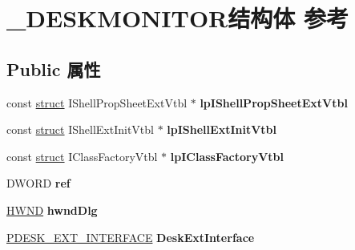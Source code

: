 \hypertarget{struct___d_e_s_k_m_o_n_i_t_o_r}{}\section{\+\_\+\+D\+E\+S\+K\+M\+O\+N\+I\+T\+O\+R结构体 参考}
\label{struct___d_e_s_k_m_o_n_i_t_o_r}
\subsection*{Public 属性}
\begin{DoxyCompactItemize}
\item 
\mbox{\label{struct___d_e_s_k_m_o_n_i_t_o_r_a28551a3be85d54c789c91563d37ef0de}} 
const \hyperlink{interfacestruct}{struct} I\+Shell\+Prop\+Sheet\+Ext\+Vtbl $\ast$ {\bfseries lp\+I\+Shell\+Prop\+Sheet\+Ext\+Vtbl}
\item 
\mbox{\label{struct___d_e_s_k_m_o_n_i_t_o_r_a8741bf2c64103741804e0382361f6235}} 
const \hyperlink{interfacestruct}{struct} I\+Shell\+Ext\+Init\+Vtbl $\ast$ {\bfseries lp\+I\+Shell\+Ext\+Init\+Vtbl}
\item 
\mbox{\label{struct___d_e_s_k_m_o_n_i_t_o_r_a6afc73c8e8c1b6695e4f182224420387}} 
const \hyperlink{interfacestruct}{struct} I\+Class\+Factory\+Vtbl $\ast$ {\bfseries lp\+I\+Class\+Factory\+Vtbl}
\item 
\mbox{\label{struct___d_e_s_k_m_o_n_i_t_o_r_a34d25d320b9c92a676b04f2262b54a4a}} 
D\+W\+O\+RD {\bfseries ref}
\item 
\mbox{\label{struct___d_e_s_k_m_o_n_i_t_o_r_acb312f82d85d8b802bc793cb0e0577c9}} 
\hyperlink{interfacevoid}{H\+W\+ND} {\bfseries hwnd\+Dlg}
\item 
\mbox{\label{struct___d_e_s_k_m_o_n_i_t_o_r_af061a04226a82b2f0dee48a91812b0bd}} 
\hyperlink{struct___d_e_s_k___e_x_t___i_n_t_e_r_f_a_c_e}{P\+D\+E\+S\+K\+\_\+\+E\+X\+T\+\_\+\+I\+N\+T\+E\+R\+F\+A\+CE} {\bfseries Desk\+Ext\+Interface}
\item 
\mbox{\label{struct___d_e_s_k_m_o_n_i_t_o_r_abe85ac312834bdc82da07d8ad67ec489}} 

\end{DoxyCompactItemize}
